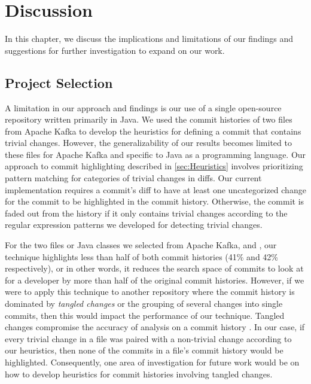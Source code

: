 \chapter{Discussion}
\label{ch:Discussion}


In this chapter, we discuss the implications and limitations of our findings 
and suggestions for further investigation to expand on our work.


\section{Project Selection}

A limitation in our approach and findings is our use of a single open-source repository written primarily in Java.
We used the commit histories of two files from Apache Kafka to develop the heuristics for defining a commit that contains trivial changes.
However, the generalizability of our results becomes limited to these files for Apache Kafka and specific to Java as a programming language.
Our approach to commit highlighting described in \autoref{sec:Heuristics}
involves prioritizing pattern matching for categories of trivial changes in diffs.
Our current implementation requires a commit's diff to have at least one uncategorized change
for the commit to be highlighted in the commit history.
Otherwise, the commit is faded out from the history if it only contains trivial changes according to the regular expression patterns
we developed for detecting trivial changes.

For the two files or Java classes we selected from Apache Kafka,
 and ,
our technique highlights less than half of both commit histories (41\% and 42\% respectively),
or in other words, it reduces the search space of commits to look at for a developer 
by more than half of the original commit histories.
However, if we were to apply this technique to another repository where the commit history is 
dominated by \emph{tangled changes} or the grouping of several changes into single commits, 
then this would impact the performance of our technique.
Tangled changes compromise the accuracy of analysis on a commit history \cite{herzig_tangled_2013}.
In our case, if every trivial change in a file was paired with a non-trivial change according to our heuristics,
then none of the commits in a file's commit history would be highlighted.
Consequently, one area of investigation for future work would be on how to
develop heuristics for commit histories involving tangled changes.


